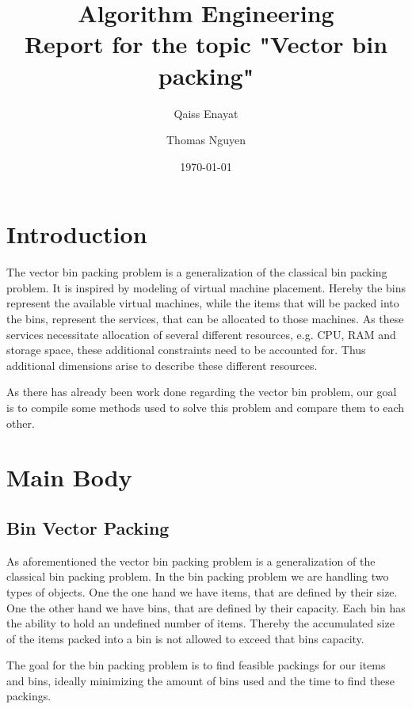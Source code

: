 \documentclass[a4paper,11pt,titlepage]{article}
\begin{document}
\begin{titlepage}
    \title{Algorithm Engineering\\Report for the topic "Vector bin packing"}
    \author{Qaiss Enayat \and Thomas Nguyen}
    \date{\today}
\end{titlepage}
\maketitle
\tableofcontents
\pagebreak
\section{Introduction}
The vector bin packing problem is a generalization of the classical bin packing problem. It is inspired by modeling of virtual machine placement. Hereby the bins represent the available virtual machines, while the items that will be packed into the bins, represent the services, that can be allocated to those machines. As these services necessitate allocation of several different resources, e.g. CPU, RAM and storage space, these additional constraints need to be accounted for. Thus additional dimensions arise to describe these different resources.

As there has already been work done regarding the vector bin problem, our goal is to compile some methods used to solve this problem and compare them to each other.

\section{Main Body}

\subsection{Bin Vector Packing}
As aforementioned the vector bin packing problem is a generalization of the classical bin packing problem. In the bin packing problem we are handling two types of objects. One the one hand we have items, that are defined by their size. One the other hand we have bins, that are defined by their capacity. Each bin has the ability to hold an undefined number of items. Thereby the accumulated size of the items packed into a bin is not allowed to exceed that bins capacity.

The goal for the bin packing problem is to find feasible packings for our items and bins, ideally minimizing the amount of bins used and the time to find these packings.
\end{document}
